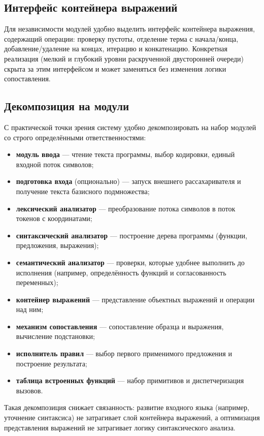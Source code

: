 \documentclass[14pt, russian]{scrartcl}
\begin{document}
\subsection{Интерфейс контейнера выражений}

Для независимости модулей удобно выделить интерфейс контейнера выражения, содержащий операции:
проверку пустоты, отделение терма с начала/конца, добавление/удаление на концах, итерацию и конкатенацию.
Конкретная реализация (мелкий и глубокий уровни раскрученной двусторонней очереди) скрыта за этим
интерфейсом и может заменяться без изменения логики сопоставления.

\subsection{Декомпозиция на модули}

С практической точки зрения систему удобно декомпозировать на набор модулей со строго определёнными ответственностями:
\begin{itemize}
  \item \textbf{модуль ввода} --- чтение текста программы, выбор кодировки, единый входной поток символов;
  \item \textbf{подготовка входа} (опционально) --- запуск внешнего рассахаривателя и получение текста базисного подмножества;
  \item \textbf{лексический анализатор} --- преобразование потока символов в поток токенов с координатами;
  \item \textbf{синтаксический анализатор} --- построение дерева программы (функции, предложения, выражения);
  \item \textbf{семантический анализатор} --- проверки, которые удобнее выполнить до исполнения (например, определённость функций и согласованность переменных);
  \item \textbf{контейнер выражений} --- представление объектных выражений и операции над ним;
  \item \textbf{механизм сопоставления} --- сопоставление образца и выражения, вычисление подстановки;
  \item \textbf{исполнитель правил} --- выбор первого применимого предложения и построение результата;
  \item \textbf{таблица встроенных функций} --- набор примитивов и диспетчеризация вызовов.
\end{itemize}

Такая декомпозиция снижает связанность: развитие входного языка (например, уточнение синтаксиса) не затрагивает слой контейнера выражений,
а оптимизация представления выражений не затрагивает логику синтаксического анализа.
\end{document}
